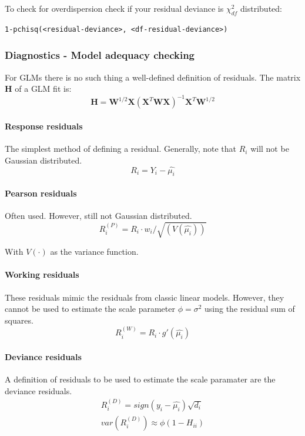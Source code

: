 To check for overdispersion check if your residual deviance is $\chi^2_{df}$ distributed:
\begin{lstlisting}
1-pchisq(<residual-deviance>, <df-residual-deviance>)
\end{lstlisting}

\subsubsection{Diagnostics -  Model adequacy checking}
For GLMs there is no such thing a well-defined definition of residuals. The matrix $\bm{H}$ of a GLM fit is:
\begin{equation*}
\bm{H}=\bm{W}^{1/2}\bm{X}(\bm{X}^T\bm{W}\bm{X})^{-1}\bm{X}^T\bm{W}^{1/2}
\end{equation*}

\paragraph{Response residuals} The simplest method of defining a residual. Generally, note that $R_i$ will not be Gaussian distributed. 
\begin{equation*}
R_i = Y_i - \hat{\mu_i}
\end{equation*}

\paragraph{Pearson residuals}
Often used. However, still not Gaussian distributed.
\begin{equation*}
R_i^{(P)} = R_i \cdot w_i/\sqrt{(V(\hat{\mu_i}))}
\end{equation*}

With $V(\cdot)$ as the variance function.

\paragraph{Working residuals}
These residuals mimic the residuals from classic linear models. However, they cannot be used to estimate the scale parameter $\phi = \sigma^2$ using the residual sum of squares. 
\begin{equation*}
R_i^{(W)} = R_i\cdot g'(\hat{\mu_i})
\end{equation*}

\paragraph{Deviance residuals}
A definition of residuals to be used to estimate the scale paramater are the deviance residuals.
\begin{gather*}
R_i^{(D)} = sign(y_i - \hat{\mu_i})\sqrt{d_i} \\
var\left(R_i^{(D)}\right)\approx \phi(1-H_{ii})
\end{gather*}

